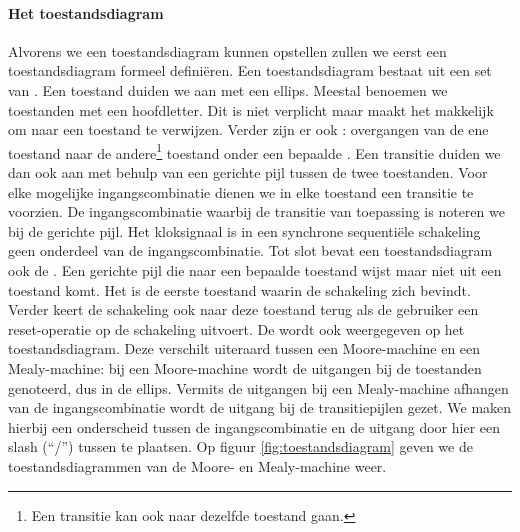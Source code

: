 \paragraph{Het toestandsdiagram} Alvorens we een toestandsdiagram kunnen opstellen zullen we eerst een toestandsdiagram formeel defini\"eren. Een toestandsdiagram bestaat uit een set van . Een toestand duiden we aan met een ellips. Meestal benoemen we toestanden met een hoofdletter. Dit is niet verplicht maar maakt het makkelijk om naar een toestand te verwijzen. Verder zijn er ook : overgangen van de ene toestand naar de andere\footnote{Een transitie kan ook naar dezelfde toestand gaan.} toestand onder een bepaalde . Een transitie duiden we dan ook aan met behulp van een gerichte pijl tussen de twee toestanden. Voor elke mogelijke ingangscombinatie dienen we in elke toestand een transitie te voorzien. De ingangscombinatie waarbij de transitie van toepassing is noteren we bij de gerichte pijl. Het kloksignaal is in een synchrone sequenti\"ele schakeling geen onderdeel van de ingangscombinatie. Tot slot bevat een toestandsdiagram ook de . Een gerichte pijl die naar een bepaalde toestand wijst maar niet uit een toestand komt. Het is de eerste toestand waarin de schakeling zich bevindt. Verder keert de schakeling ook naar deze toestand terug als de gebruiker een reset-operatie op de schakeling uitvoert. De  wordt ook weergegeven op het toestandsdiagram. Deze verschilt uiteraard tussen een Moore-machine en een Mealy-machine: bij een Moore-machine wordt de uitgangen bij de toestanden genoteerd, dus in de ellips. Vermits de uitgangen bij een Mealy-machine afhangen van de ingangscombinatie wordt de uitgang bij de transitiepijlen gezet. We maken hierbij een onderscheid tussen de ingangscombinatie en de uitgang door hier een slash (``/'') tussen te plaatsen. Op figuur \ref{fig:toestandsdiagram} geven we de toestandsdiagrammen van de Moore- en Mealy-machine weer.
